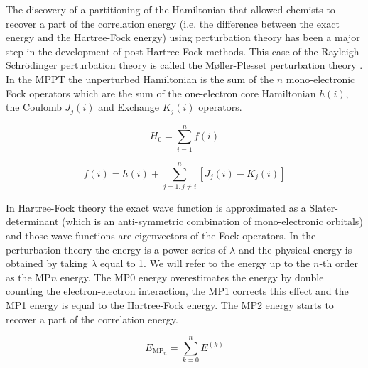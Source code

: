 \documentclass[11pt,a4paper]{article}
\begin{document}
The discovery of a partitioning of the Hamiltonian that allowed chemists to recover a part of the correlation energy (i.e. the difference between the exact energy and the Hartree-Fock energy) using perturbation theory has been a major step in the development of post-Hartree-Fock methods. This case of the Rayleigh-Schrödinger perturbation theory is called the M{\o}ller-Plesset perturbation theory \cite{Moller_1934}. In the MPPT the unperturbed Hamiltonian is the sum of the $n$ mono-electronic Fock operators which are the sum of the one-electron core Hamiltonian $h(i)$, the Coulomb $J_j(i)$ and Exchange $K_j(i)$ operators.
 
\begin{equation}
H_0= \sum\limits_{i=1}^{n} f(i)
\end{equation}

\begin{equation}
f(i) = h(i) + \sum\limits_{j=1,j \neq i}^{n} \left[J_j(i) - K_j(i)\right]
\end{equation}

In Hartree-Fock theory the exact wave function is approximated as a Slater-determinant (which is an anti-symmetric combination of mono-electronic orbitals) and those wave functions are eigenvectors of the Fock operators. In the perturbation theory the energy is a power series of $\lambda$ and the physical energy is obtained by taking $\lambda$ equal to 1. We will refer to the energy up to the $n$-th order as the MP$n$ energy. The MP0 energy overestimates the energy by double counting the electron-electron interaction, the MP1 corrects this effect and the MP1 energy is equal to the Hartree-Fock energy. The MP2 energy starts to recover a part of the correlation energy.

\begin{equation}
E_{\text{MP$_{n}$}}= \sum_{k=0}^n E^{(k)}
\end{equation}
\end{document}
